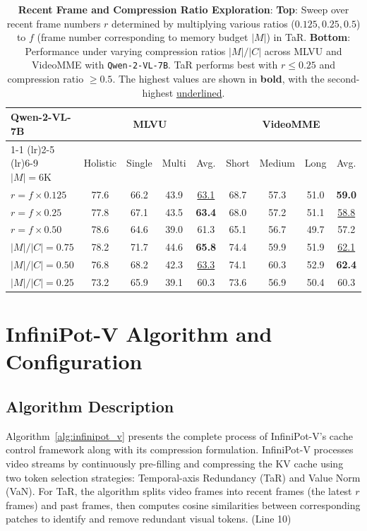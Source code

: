\begin{table}[t]
\centering
\small
\begin{tabular}{lcccccccc}
\toprule
Qwen-2-VL-7B & \multicolumn{4}{c}{MLVU}            & \multicolumn{4}{c}{VideoMME}      \\
 \cmidrule(lr){1-1} \cmidrule(lr){2-5} \cmidrule(lr){6-9}
 $|M| = 6\text{K}$  & Holistic & Single & Multi & Avg. & Short & Medium & Long & Avg. \\
\midrule
$r=f\times0.125$        & 77.6 & 66.2 & 43.9 & \underline{63.1} & 68.7 & 57.3 & 51.0 & \textbf{59.0} \\
$r=f\times0.25$         & 77.8 & 67.1 & 43.5 & \textbf{63.4} & 68.0 & 57.2 & 51.1 & \underline{58.8} \\
$r=f\times0.50$          & 78.6 & 64.6 & 39.0 & 61.3 & 65.1 & 56.7 & 49.7 & 57.2 \\
\midrule
$|M|/|C|=0.75$   & 78.2 & 71.7 & 44.6 & \textbf{65.8} & 74.4 & 59.9 & 51.9 & \underline{62.1} \\
$|M|/|C|=0.50$   & 76.8 & 68.2 & 42.3 & \underline{63.3} & 74.1 & 60.3 & 52.9 & \textbf{62.4} \\
$|M|/|C|=0.25$   & 73.2 & 65.9 & 39.1 & 60.3 & 73.6 & 56.9 & 50.4 & 60.3 \\
\bottomrule
\end{tabular}
\vspace{2mm}
\caption{\textbf{Recent Frame and Compression Ratio Exploration}: \textbf{Top}: Sweep over recent frame numbers $r$ determined by multiplying various ratios ($0.125, 0.25, 0.5$) to $f$ (frame number corresponding to memory budget $|M|$) in TaR. \textbf{Bottom}: Performance under varying compression ratios $|M|/|C|$ across MLVU and VideoMME with \texttt{Qwen-2-VL-7B}. TaR performs best with $r\leq0.25$ and compression ratio $\geq0.5$. The highest values are shown in \textbf{bold}, with the second-highest \underline{underlined}.}
\label{tab:recent_compress_ratio}
\vspace{-.2in}
\end{table}

\section{InfiniPot-V Algorithm and Configuration}\label{appn:algorithm}


\subsection{Algorithm Description} Algorithm~\ref{alg:infinipot_v} presents the complete process of InfiniPot-V's cache control framework along with its compression formulation. InfiniPot-V processes video streams by continuously pre-filling and compressing the KV cache using two token selection strategies: Temporal-axis Redundancy (TaR) and Value Norm (VaN). For TaR, the algorithm splits video frames into recent frames (the latest $r$ frames) and past frames, then computes cosine similarities between corresponding patches to identify and remove redundant visual tokens. (Line 10)

